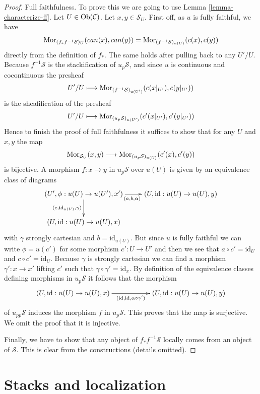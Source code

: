 \begin{proof}
\medskip\noindent
Full faithfulness. To prove this we are going to use
Lemma \ref{lemma-characterize-ff}.
Let $U \in \mathop{\mathrm{Ob}}\nolimits(\mathcal{C})$.
Let $x, y \in \mathcal{S}_U$.
First off, as $u$ is fully faithful, we have
$$
\mathop{\mathrm{Mor}}\nolimits_{(f_*f^{-1}\mathcal{S})_U}(can(x), can(y))
=
\mathop{\mathrm{Mor}}\nolimits_{(f^{-1}\mathcal{S})_{u(U)}}(c(x), c(y))
$$
directly from the definition of $f_*$. The same holds after
pulling back to any $U'/U$. Because $f^{-1}\mathcal{S}$ is the
stackification of $u_p\mathcal{S}$, and since $u$ is continuous
and cocontinuous the presheaf
$$
U'/U \longmapsto
\mathop{\mathrm{Mor}}\nolimits_{(f^{-1}\mathcal{S})_{u(U')}}(c(x|_{U'}), c(y|_{U'}))
$$
is the sheafification of the presheaf
$$
U'/U \longmapsto
\mathop{\mathrm{Mor}}\nolimits_{(u_p\mathcal{S})_{u(U')}}(c'(x|_{U'}), c'(y|_{U'}))
$$
Hence to finish the proof of full faithfulness it suffices
to show that for any $U$ and $x, y$ the map
$$
\mathop{\mathrm{Mor}}\nolimits_{\mathcal{S}_U}(x, y)
\longrightarrow
\mathop{\mathrm{Mor}}\nolimits_{(u_p\mathcal{S})_{u(U)}}(c'(x), c'(y))
$$
is bijective. A morphism $f : x \to y$ in $u_p\mathcal{S}$ over $u(U)$
is given by an equivalence class of diagrams
$$
\xymatrix{
(U', \phi : u(U) \to u(U'), x')
\ar[d]_{(c, \text{id}_{u(U)}, \gamma)}
\ar[r]_{(a, b, \alpha)} &
(U, \text{id} : u(U) \to u(U), y)
\\
(U, \text{id} : u(U) \to u(U), x)
}
$$
with $\gamma$ strongly cartesian and $b = \text{id}_{u(U)}$.
But since $u$ is fully faithful we can write $\phi = u(c')$ for some
morphism $c' : U \to U'$
and then we see that $a \circ c' = \text{id}_U$ and
$c \circ c' = \text{id}_U$. Because $\gamma$ is strongly cartesian
we can find a morphism $\gamma' : x \to x'$ lifting $c'$ such that
$\gamma \circ \gamma' = \text{id}_x$. By definition of the equivalence
classes defining morphisms in $u_p\mathcal{S}$ it follows that
the morphism
$$
\xymatrix{
(U, \text{id} : u(U) \to u(U), x)
\ar[rr]_{(\text{id}, \text{id}, \alpha \circ \gamma')} & &
(U, \text{id} : u(U) \to u(U), y)
}
$$
of $u_{pp}\mathcal{S}$ induces the morphism $f$ in $u_p\mathcal{S}$.
This proves that the map is surjective. We omit the proof that it is
injective.

\medskip\noindent
Finally, we have to show that any object of $f_*f^{-1}\mathcal{S}$
locally comes from an object of $\mathcal{S}$. This is clear from the
constructions (details omitted).
\end{proof}




\section{Stacks and localization}
\label{section-localize}

